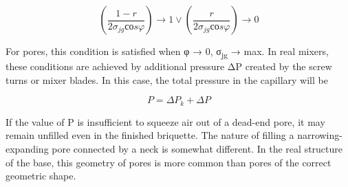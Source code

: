 \begin{multicols}{2}
\[\left( \frac{1 - r}{2\sigma_{jg}соs\varphi} \right) \rightarrow 1 \vee \left( \frac{r}{2\sigma_{jg}соs\varphi} \right) \rightarrow 0\]

For pores, this condition is satisfied when φ → 0, σ\textsubscript{jg} →
max. In real mixers, these conditions are achieved by additional
pressure ΔP created by the screw turns or mixer blades. In this case,
the total pressure in the capillary will be

\begin{equation*}
    P = \Delta P_k + \Delta P
\end{equation*}

If the value of P is insufficient to squeeze air out of a dead-end pore,
it may remain unfilled even in the finished briquette. The nature of
filling a narrowing-expanding pore connected by a neck is somewhat
different. In the real structure of the base, this geometry of pores is
more common than pores of the correct geometric shape.
\end{multicols}

